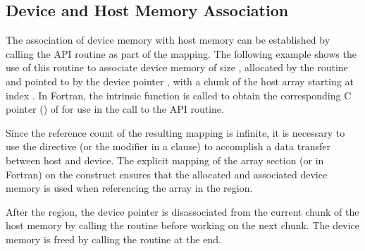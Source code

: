 \subsection{Device and Host Memory Association}
\label{subsec:target_associate_ptr}
\label{sec:target_associate_ptr}

The association of device memory with host memory
can be established by calling the  
API routine as part of the mapping.
The following example shows the use of this routine
to associate device memory of size , 
allocated by the  routine and
pointed to by the device pointer , 
with a chunk of the host array  starting at index .
In Fortran, the intrinsic function  is called
to obtain the corresponding C pointer () of  
for use in the call to the API routine.

Since the reference count of the resulting mapping is infinite,
it is necessary to use the  directive (or
the  modifier in a  clause) to accomplish a
data transfer between host and device.
The explicit mapping of the array section  
(or  in Fortran) on the 
construct ensures that the allocated and associated device memory is used 
when referencing the array  in the  region.

After the  region, the device pointer is disassociated from
the current chunk of the host memory by calling the  routine before working on the next chunk.
The device memory is freed by calling the 
routine at the end.



